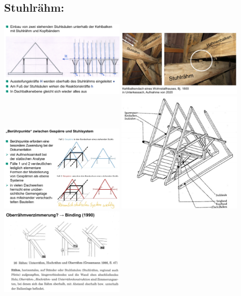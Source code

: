 \documentclass[fleqn,twoside]{article}
\begin{document}
    \subsection{Stuhlrähm:}
            \includegraphics[width=0.45\textwidth]{Grafiken/Daecher/Kehlbalkendach mit Stuhlraehm und Kopfbaendern.jpg}
            \includegraphics[width=0.45\textwidth]{Grafiken/Daecher/Verbindung Stuhlraehm Hahnenbalken.jpg}\\
            \includegraphics[width=0.45\textwidth]{Grafiken/Daecher/Gespaerre und Stuhlsystem Beruehrpunkt.png}
            \includegraphics[width=0.45\textwidth]{Grafiken/Daecher/Kehlbalkendach mit Stuhlraehm.jpg}\\
            \includegraphics[width=0.45\textwidth]{Grafiken/Daecher/Oberraehmverzimmerung.jpg}
\end{document}
